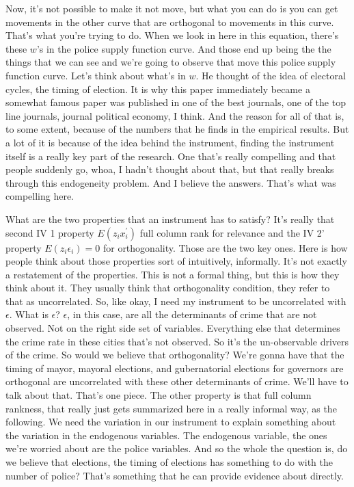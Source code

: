 \documentclass[11pt,a4paper]{amsart}
\theoremstyle{plain}
\theoremstyle{definition}
\begin{document}
 		  Now, it's not possible to make it not move, but what you can do is you can get movements in the other curve that are orthogonal to movements in this curve. That's what you're trying to do. When we look in here in this equation, there's these $w$'s in the police supply function curve. And those end up being the the things that we can see and we're going to observe that move this police supply function curve. Let's think about what's in $w$. He thought of the idea of electoral cycles, the timing of election. It is why this paper immediately became a somewhat famous paper was published in one of the best journals, one of the top line journals, journal political economy, I think.  And the reason for all of that is, to some extent, because of the numbers that he finds in the empirical results. But a lot of it is because of the idea behind the instrument, finding the instrument itself is a really key part of the research. One that's really compelling and that people suddenly go, whoa, I hadn't thought about that, but that really breaks through this endogeneity problem. And I believe the answers. That's what was compelling here.\par 
 		  What are the two properties that an instrument has to satisfy? It's really that second IV 1 property $E(z_{i}x^{'}_{i})$ full column rank for relevance and the IV 2' property $E(z_{i}\epsilon_{i}) = 0$ for orthogonality. Those are the two key ones. Here is how people think about those properties sort of intuitively, informally.  It's not exactly a restatement of the properties. This is not a formal thing, but this is how they think about it. They usually think that orthogonality condition, they refer to that as uncorrelated. So, like okay, I need my instrument to be uncorrelated with $\epsilon$. What is $\epsilon$? $\epsilon$, in this case, are all the determinants of crime that are not observed.  Not on the right side set of variables. Everything else that determines the crime rate in these cities that's not observed. So it's the un-observable drivers of the crime. So would we believe that orthogonality?
 		  We're gonna have that the timing of mayor, mayoral elections, and gubernatorial elections for governors are orthogonal are uncorrelated with these other determinants of crime. We'll have to talk about that. That's one piece. The other property is that full column rankness, that really just gets summarized here in a really informal way, as the following. We need the variation in our instrument to explain something about the variation in the endogenous variables.  The endogenous variable, the ones we're worried about are the police variables. And so the whole the question is, do we believe that elections, the timing of elections has something to do with the number of police? That's something that he can provide evidence about directly. \par 
\end{document}

